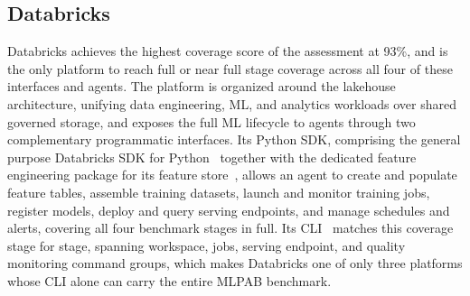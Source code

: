 \documentclass[
english,                 %
bibtex,                  %
]{kththesis}
\numberwithin{listing}{chapter}
\begin{document}
\subsection{Databricks}
\label{sec:results_databricks}
\glsresetall

Databricks achieves the highest coverage score of the assessment at 93\%, and is the only platform to reach full or near full stage coverage across all four of these interfaces and agents. The platform is organized around the lakehouse architecture, unifying data engineering, \gls{ML}, and analytics workloads over shared governed storage, and exposes the full \gls{ML} lifecycle to agents through two complementary programmatic interfaces. Its Python \gls{SDK}, comprising the general purpose Databricks \gls{SDK} for Python~\cite{databricks_databricksdatabricks-sdk-py_2026} together with the dedicated feature engineering package for its feature store~\cite{databricks_databricks-feature-engineering_2026}, allows an agent to create and populate feature tables, assemble training datasets, launch and monitor training jobs, register models, deploy and query serving endpoints, and manage schedules and alerts, covering all four benchmark stages in full. Its \gls{CLI}~\cite{databricks_databrickscli_2026} matches this coverage stage for stage, spanning workspace, jobs, serving endpoint, and quality monitoring command groups, which makes Databricks one of only three platforms whose \gls{CLI} alone can carry the entire \gls{MLPAB} benchmark.
\end{document}
